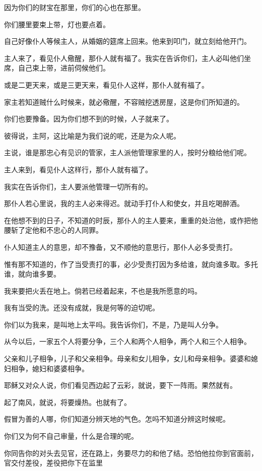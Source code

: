 \documentclass[12pt,oneside]{book}
\begin{document}
因为你们的财宝在那里，你们的心也在那里。

你们腰里要束上带，灯也要点着。

自己好像仆人等候主人，从婚姻的筵席上回来。他来到叩门，就立刻给他开门。

主人来了，看见仆人儆醒，那仆人就有福了。我实在告诉你们，主人必叫他们坐席，自己束上带，进前伺候他们。

或是二更天来，或是三更天来，看见仆人这样，那仆人就有福了。

家主若知道贼什么时候来，就必儆醒，不容贼挖透房屋，这是你们所知道的。

你们也要豫备。因为你们想不到的时候，人子就来了。

彼得说，主阿，这比喻是为我们说的呢，还是为众人呢。

主说，谁是那忠心有见识的管家，主人派他管理家里的人，按时分粮给他们呢。

主人来到，看见仆人这样行，那仆人就有福了。

我实在告诉你们，主人要派他管理一切所有的。

那仆人若心里说，我的主人必来得迟。就动手打仆人和使女，并且吃喝醉酒。

在他想不到的日子，不知道的时辰，那仆人的主人要来，重重的处治他，或作把他腰斩了定他和不忠心的人同罪。

仆人知道主人的意思，却不豫备，又不顺他的意思行，那仆人必多受责打。

惟有那不知道的，作了当受责打的事，必少受责打因为多给谁，就向谁多取。多托谁，就向谁多要。

我来要把火丢在地上。倘若已经着起来，不也是我所愿意的吗。

我有当受的洗。还没有成就，我是何等的迫切呢。

你们以为我来，是叫地上太平吗。我告诉你们，不是，乃是叫人分争。

从今以后，一家五个人将要分争，三个人和两个人相争，两个人和三个人相争。

父亲和儿子相争，儿子和父亲相争。母亲和女儿相争，女儿和母亲相争。婆婆和媳妇相争，媳妇和婆婆相争。

耶稣又对众人说，你们看见西边起了云彩，就说，要下一阵雨。果然就有。

起了南风，就说，将要燥热。也就有了。

假冒为善的人哪，你们知道分辨天地的气色。怎吗不知道分辨这时候呢。

你们又为何不自己审量，什么是合理的呢。

你同告你的对头去见官，还在路上，务要尽力的和他了结。恐怕他拉你到官面前，官交付差役，差役把你下在监里
\end{document}
